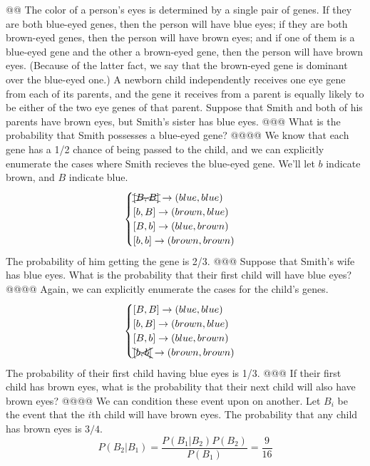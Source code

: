 \documentclass[10pt]{article}
\begin{document}
\begin{easylist}[enumerate]
    @@ The color of a person's eyes is determined by a single pair of genes. If they are both blue-eyed genes, then the
    person will have blue eyes; if they are both brown-eyed genes, then the person will have brown eyes; and if one of
    them is a blue-eyed gene and the other a brown-eyed gene, then the person will have brown eyes. (Because of the
    latter fact, we say that the brown-eyed gene is dominant over the blue-eyed one.) A newborn child independently
    receives one eye gene from each of its parents, and the gene it receives from a parent is equally likely to be
    either of the two eye genes of that parent. Suppose that Smith and both of his parents have brown eyes, but Smith's
    sister has blue eyes.
    @@@ What is the probability that Smith possesses a blue-eyed gene?
    @@@@ We know that each gene has a 1/2 chance of being passed to the child, and we can explicitly enumerate the cases
    where Smith recieves the blue-eyed gene. We'll let $b$ indicate brown, and $B$ indicate blue.
        \[
            \begin{cases}
                \xcancel{[B, B]} \to (blue, blue)\\
                [ b, B ] \to (brown, blue)\\
                [ B, b ] \to (blue, brown)\\
                [ b, b ] \to (brown, brown)\\
            \end{cases}
        \]
    The probability of him getting the gene is 2/3.
    @@@ Suppose that Smith's wife has blue eyes. What is the probability that their first child will have blue eyes?
    @@@@ Again, we can explicitly enumerate the cases for the child's genes.
        \[
            \begin{cases}
                [ B, B ] \to (blue, blue)\\
                [ b, B ] \to (brown, blue)\\
                [ B, b ] \to (blue, brown)\\
                \xcancel{[ b, b ]} \to (brown, brown)\\
            \end{cases}
        \]
    The probability of their first child having blue eyes is 1/3.
    @@@ If their first child has brown eyes, what is the probability that their next child will also have brown eyes?
    @@@@ We can condition these event upon on another. Let $B_i$ be the event that the $i$th child will have brown eyes.
    The probability that any child has brown eyes is $3/4$.
        \[
            P(B_2|B_1) = \frac{P(B_1|B_2)P(B_2)}{P(B_1)} = \boxed{\frac{9}{16} }
        \]


\end{easylist}
\end{document}
